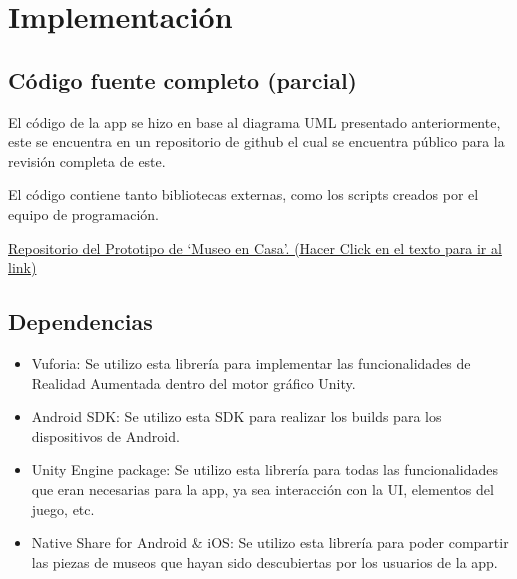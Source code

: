 \section{Implementación}

\subsection{Código fuente completo (parcial)}
El código de la app se hizo en base al diagrama UML presentado anteriormente, este se encuentra en un repositorio de github el cual se encuentra público para la revisión completa de este.

El código contiene tanto bibliotecas externas, como los scripts creados por el equipo de programación. 

\href{https://github.com/pokelocos/Prototipo_Ing_Software/tree/master/repo_ingSoftware}{Repositorio del Prototipo de `Museo en Casa'. (Hacer Click en el texto para ir al link)}



\subsection{Dependencias}

\begin{itemize}

\item Vuforia: Se utilizo esta librería para implementar las funcionalidades de Realidad Aumentada dentro del motor gráfico Unity.

\item Android SDK: Se utilizo esta SDK para realizar los builds para los dispositivos de Android.

\item Unity Engine package: Se utilizo esta librería para todas las funcionalidades que eran necesarias para la app, ya sea interacción con la UI, elementos del juego, etc.

\item Native Share for Android & iOS: Se utilizo esta librería para poder compartir las piezas de museos que hayan sido descubiertas por los usuarios de la app.


\end{itemize}